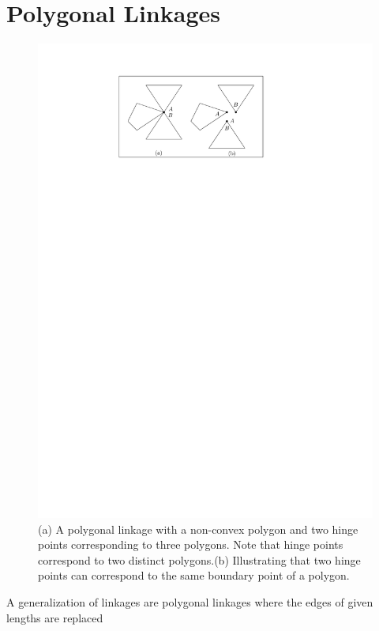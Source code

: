 \section{Polygonal Linkages}
\begin{figure}[h]
\begin{center}
\includegraphics[scale=1]{graphics/hingeOnThreeDistinctPolygons.pdf}
\end{center} 
\caption{(a) A polygonal linkage with a non-convex polygon and two hinge points corresponding to 
three polygons.  Note that hinge points correspond to two distinct polygons.(b) Illustrating that 
two hinge points can correspond to the same boundary point of a polygon.}
\label{fig:linkage-1}
\end{figure}
A generalization of linkages are polygonal linkages where the edges of given lengths are replaced 
